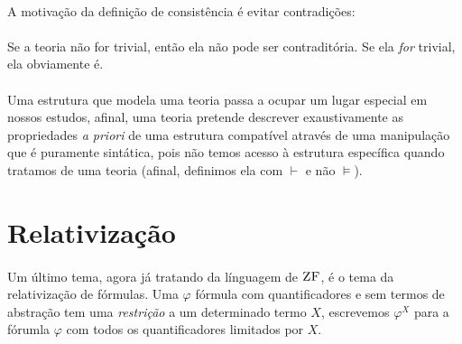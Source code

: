         \paragraph{}
            A motivação da definição de consistência é evitar contradições: 
            \begin{prooftree}



            \end{prooftree}
        \paragraph{}
            Se a teoria não for trivial, então ela não pode ser 
            contraditória. Se ela \emph{for} trivial, ela  
            obviamente é.
        \paragraph{}
            Uma estrutura que modela uma teoria passa a ocupar um 
            lugar especial em nossos estudos, afinal, uma teoria 
            pretende descrever exaustivamente as propriedades 
            \emph{a priori} de uma estrutura compatível através de 
            uma manipulação que é puramente sintática, pois não temos 
            acesso à estrutura específica quando tratamos de uma 
            teoria (afinal, definimos ela com $\vdash$ e não $\vDash$).
    \section{Relativização}
        \paragraph{}
            Um último tema, agora já tratando da línguagem de $\ZF$, é 
            o tema da relativização de fórmulas. Uma $\varphi$ fórmula 
            com quantificadores e sem termos de abstração tem uma 
            \textit{restrição} a um determinado termo $X$, escrevemos 
            $\varphi^X$ para a fórumla $\varphi$ com todos 
            os quantificadores limitados por $X$.

